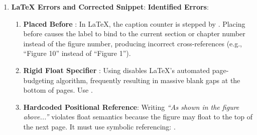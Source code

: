 \begin{enumerate}
\begin{enumerate}
        \item \textbf{Standard Deviation and Standard Error}:
        Sample standard deviation:
        \begin{equation*}
        s = \sqrt{0.26667} \approx \mathbf{0.5164\,\mu\text{A}}
        \end{equation*}
        Standard error of the mean:
        \begin{equation*}
        SE = \frac{s}{\sqrt{N}} = \frac{0.5164}{\sqrt{4}} = \frac{0.5164}{2} = \mathbf{0.2582\,\mu\text{A}}
        \end{equation*}

        \item \textbf{Student's $t$-Confidence Interval}:
        With $t_{0.025, \, 3} = 3.182$, the margin of error ($ME$) is:
        \begin{equation*}
        ME = t_{0.025, \, 3} \times SE = 3.182 \times 0.2582 \approx \mathbf{0.8216\,\mu\text{A}} \approx \mathbf{0.82\,\mu\text{A}}
        \end{equation*}
        The $95\%$ confidence interval is:
        \begin{equation*}
        \text{CI}_{95\%} = \bar{I} \pm ME = 15.00 \pm 0.82\,\mu\text{A} = [\mathbf{14.18\,\mu\text{A}}, \, \mathbf{15.82\,\mu\text{A}}]
        \end{equation*}

        \item \textbf{Scientific Reporting Format}:
        \emph{``The quiescent deep-sleep current draw of the sensor node was $15.00 \pm 0.52\,\mu\text{A}$ (mean $\pm$ standard deviation across $N=4$ hardware prototypes; $95\%$ CI: $[14.18, 15.82]\,\mu\text{A}$).''}
    \end{enumerate}

    \item \textbf{\LaTeX{} Errors and Corrected Snippet}:
    \textbf{Identified Errors}:
    \begin{enumerate}
        \item \textbf{\code{\\label} Placed Before \code{\\caption}}: In \LaTeX{}, the caption counter is stepped by \code{\\caption}. Placing  before \code{\\caption} causes the label to bind to the current section or chapter number instead of the figure number, producing incorrect cross-references (e.g., ``Figure 10'' instead of ``Figure 1'').
        \item \textbf{Rigid Float Specifier \code{[H]}}: Using \code{[H]} disables \LaTeX{}'s automated page-budgeting algorithm, frequently resulting in massive blank gaps at the bottom of pages. Use \code{[htbp]}.
        \item \textbf{Hardcoded Positional Reference}: Writing \emph{``As shown in the figure above...''} violates float semantics because the figure may float to the top of the next page. It must use symbolic referencing: .
    \end{enumerate}


\end{enumerate}
